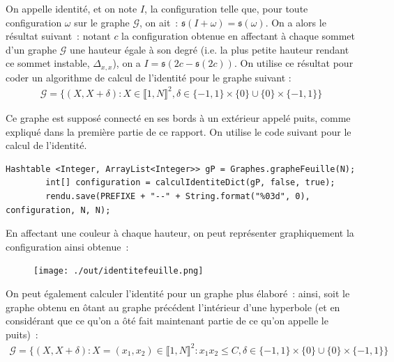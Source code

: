 \documentclass{article}
\begin{document}
On appelle identité, et on note $I$, la configuration telle que, pour toute configuration $\omega$ sur le graphe $\mathcal{G}$, on ait : $\mathfrak{s}(I+\omega)=\mathfrak{s}(\omega)$. On a alors le résultat suivant : notant $c$ la configuration obtenue en affectant à chaque sommet d'un graphe $\mathcal{G}$ une hauteur égale à son degré (i.e. la plus petite hauteur rendant ce sommet instable, $\Delta_{x,x}$), on a $I=\mathfrak{s}(2c-\mathfrak{s}(2c))$. On utilise ce résultat pour coder un algorithme de calcul de l'identité pour le graphe suivant :
\begin{align*}
	\mathcal{G} = \{(X,X+\delta) : X\in\llbracket 1, N\rrbracket^2, \delta\in\{-1,1\}\times\{0\}\cup\{0\}\times\{-1,1\}\}
\end{align*}


Ce graphe est supposé connecté en ses bords à un extérieur appelé puits, comme expliqué dans la première partie de ce rapport.
On utilise le code suivant pour le calcul de l'identité.
\begin{lstlisting}
Hashtable <Integer, ArrayList<Integer>> gP = Graphes.grapheFeuille(N);
		int[] configuration = calculIdentiteDict(gP, false, true);
		rendu.save(PREFIXE + "--" + String.format("%03d", 0), configuration, N, N);
\end{lstlisting}
En affectant une couleur à chaque hauteur, on peut représenter graphiquement la configuration ainsi obtenue :

\begin{figure}[h]
	\centering
	\texttt{[image: ./out/identitefeuille.png]}
\end{figure}

On peut également calculer l'identité pour un graphe plus élaboré : ainsi, soit le graphe obtenu en ôtant au graphe précédent l'intérieur d'une hyperbole (et en considérant que ce qu'on a ôté fait maintenant partie de ce qu'on appelle le puits) :
\begin{align*}
	\mathcal{G} = \{(X,X+\delta) : X=(x_1,x_2)\in\llbracket1,N\rrbracket^2 : x_1x_2\leq C, \delta\in \{-1,1\}\times \{0\}\cup\{0\}\times\{-1,1\}\} 
\end{align*}
\end{document}
